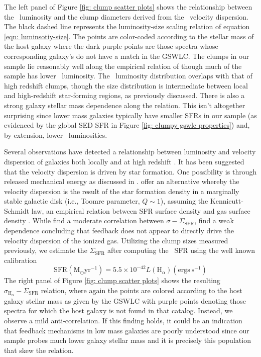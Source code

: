 The left panel of Figure \ref{fig: clump scatter plots} shows the relationship between the \ha~luminosity and the clump diameters derived from the \ha~velocity dispersion. The black dashed line represents the luminosity-size scaling relation of equation \ref{eqn: luminsotiy-size}. The points are color-coded according to the stellar mass of the host galaxy where the dark purple points are those spectra whose corresponding galaxy's do not have a match in the GSWLC. The clumps in our sample lie reasonably well along the empirical relation of \cite{Wisnioski2012} though much of the sample has lower \ha~luminosity. The \ha~luminosity distribution overlaps with that of high redshift clumps, though the size distribution is intermediate between local and high-redshift star-forming regions, as previously discussed. There is also a strong galaxy stellar mass dependence along the relation. This isn't altogether surprising since lower mass galaxies typically have smaller SFRs in our sample (as evidenced by the global SED SFR in Figure \ref{fig: clumpy gswlc properties}) and, by extension, lower \ha~luminosities. 


Several observations have detected a relationship between luminosity and velocity dispersion of galaxies both locally and at high redshift \citep{Dib2006,Green2010,Lehnert2009,Genzel2011}. It has been suggested that the velocity dispersion is driven by star formation. One possibility is through released mechanical energy as discussed in \cite{Lehnert2009}. \cite{Wisnioski2012} offer an alternative whereby the velocity dispersion is the result of the star formation density in a marginally stable galactic disk (i.e., Toomre parameter, $Q\sim1$), assuming the Kennicutt-Schmidt law, an empirical relation between SFR surface density and gas surface density \citep{Schmidt1959,Kennicutt1998a}. While \cite{Wisnioski2012} find a moderate correlation between $\sigma-\Sigma_{\mathrm{SFR}}$, \cite{Genzel2011} find a weak dependence concluding that feedback does not appear to directly drive the velocity dispersion of the ionized gas.  Utilizing the clump sizes measured previously, we estimate the $\Sigma_{\mathrm{SFR}}$ after computing the \ha~SFR using the well known calibration \citep{Kennicutt1998,Calzetti2013}
\begin{equation}
\mathrm{SFR} (\mathrm{M}_{\odot} \mathrm{yr}^{-1}) = 5.5 \times 10^{-42}L(\mathrm{H}_{\alpha}) (\mathrm{ergs\ s}^{-1})
\end{equation}
The right panel of Figure \ref{fig: clump scatter plots} shows the resulting $\sigma_{\mathrm{H}_{\alpha}}-\Sigma_{\mathrm{SFR}}$ relation, where again the points are colored according to the host galaxy stellar mass as given by the GSWLC with purple points denoting those spectra for which the host galaxy is not found in that catalog. Instead, we observe a mild anti-correlation. If this finding holds, it could be an indication that feedback mechanisms in low mass galaxies are poorly understood since our sample probes much lower galaxy stellar mass and it is precisely this population that skew the relation. 


